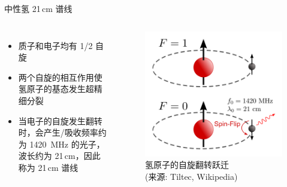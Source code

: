 \documentclass{beamer}
\begin{document}
\begin{frame}{中性氢 21\texorpdfstring{\,}{ }cm 谱线}
  \begin{columns}
    \begin{itemize}
      \item 质子和电子均有 1/2 自旋
      \item 两个自旋的相互作用使氢原子的基态发生\alert{超精细分裂}
      \item 当电子的自旋发生翻转时，会产生/吸收频率约为 \SI{1420}{\MHz} 的光子，
        波长约为 21\,cm，因此称为 \alert{21\,cm 谱线}
    \end{itemize}

    \begin{figure}
      \centering
      \includegraphics[width=\columnwidth]{hydrogen-spinflip}
      \caption{氢原子的自旋翻转跃迁\\(来源: Tiltec, Wikipedia)}
    \end{figure}
  \end{columns}
\end{frame}
\end{document}
